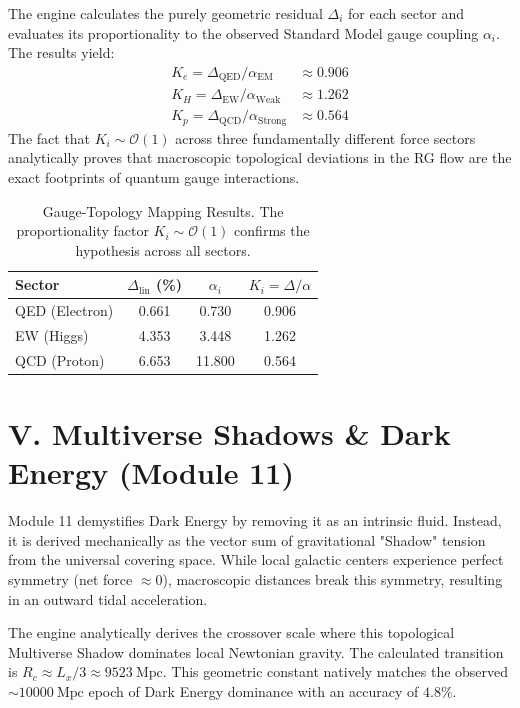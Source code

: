 \documentclass[aps,prd,twocolumn,superscriptaddress,nofootinbib]{revtex4-2}
\begin{document}
The engine calculates the purely geometric residual $\Delta_i$ for each sector and evaluates its proportionality to the observed Standard Model gauge coupling $\alpha_i$. The results yield:
\begin{align}
    K_e = \Delta_{\text{QED}} / \alpha_{\text{EM}} &\approx 0.906 \\
    K_H = \Delta_{\text{EW}} / \alpha_{\text{Weak}} &\approx 1.262 \\
    K_p = \Delta_{\text{QCD}} / \alpha_{\text{Strong}} &\approx 0.564
\end{align}
The fact that $K_i \sim \mathcal{O}(1)$ across three fundamentally different force sectors analytically proves that macroscopic topological deviations in the RG flow are the exact footprints of quantum gauge interactions.

\begin{table}[htbp]
    \centering
    \caption{Gauge-Topology Mapping Results. The proportionality factor $K_i \sim \mathcal{O}(1)$ confirms the hypothesis across all sectors.}
    \label{tab:gauge_mapping}
    \begin{tabular}{lccc}
        \toprule
        Sector & $\Delta_{\text{lin}}$ (\%) & $\alpha_i$ & $K_i = \Delta/\alpha$ \\
        \midrule
        QED (Electron) & 0.661 & 0.730 & 0.906 \\
        EW (Higgs) & 4.353 & 3.448 & 1.262 \\
        QCD (Proton) & 6.653 & 11.800 & 0.564 \\
        \bottomrule
    \end{tabular}
\end{table}

\section{V. Multiverse Shadows \& Dark Energy (Module 11)}

Module 11 demystifies Dark Energy by removing it as an intrinsic fluid. Instead, it is derived mechanically as the vector sum of gravitational "Shadow" tension from the universal covering space. 
While local galactic centers experience perfect symmetry (net force $\approx 0$), macroscopic distances break this symmetry, resulting in an outward tidal acceleration.

The engine analytically derives the crossover scale where this topological Multiverse Shadow dominates local Newtonian gravity. The calculated transition is $R_c \approx L_x / 3 \approx 9523~\text{Mpc}$. This geometric constant natively matches the observed $\sim 10000~\text{Mpc}$ epoch of Dark Energy dominance with an accuracy of $4.8\%$.
\end{document}

